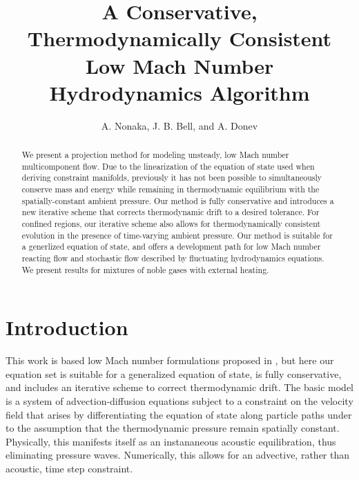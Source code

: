 \documentclass[final]{siamltex}
\begin{document}
\title{A Conservative, Thermodynamically Consistent Low Mach Number Hydrodynamics Algorithm}

\author{A. Nonaka\footnotemark[1],
        J. B. Bell\footnotemark[1], and
        A. Donev\footnotemark[2]}

\renewcommand{\thefootnote}{\fnsymbol{footnote}}


\maketitle

\begin{abstract}
We present a projection method for modeling unsteady, low Mach number multicomponent
flow.  Due to the linearization of the equation of state used when deriving
constraint manifolds, previously it has
not been possible to simultaneously conserve mass and energy while remaining in 
thermodynamic equilibrium with the spatially-constant ambient pressure.
Our method is fully conservative and introduces a new iterative scheme that 
corrects thermodynamic drift to a desired tolerance.  For confined regions, our
iterative scheme also allows for thermodynamically consistent evolution in the presence
of time-varying ambient pressure.
Our method is suitable for a generlized equation of state, and offers a development
path for low Mach number reacting flow and stochastic flow described by fluctuating
hydrodynamics equations.  We present results for mixtures of noble gases with external
heating.
\end{abstract}

\section{Introduction}
 This work is based low Mach number formulations proposed in
\cite{RehmBaum,MajdaSethian}, but here our equation set is suitable for a
generalized equation of state, is fully conservative, and includes an iterative
scheme to correct thermodynamic drift.
The basic model is a system of advection-diffusion equations
subject to a constraint on the velocity field that arises by differentiating
the equation of state along particle paths under to the assumption
that the thermodynamic pressure remain spatially constant.  Physically, this
manifests itself as an instananeous acoustic equilibration, thus eliminating
pressure waves.  Numerically, this allows for an advective, rather than acoustic,
time step constraint.
\end{document}
